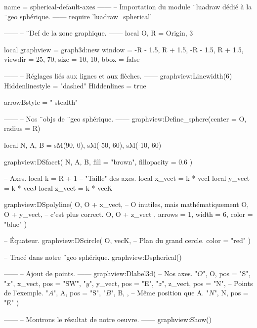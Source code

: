 \documentclass[border = 3pt]{standalone}
\begin{document}
\begin{luadraw*}{name = spherical-default-axes}
------
-- Importation du module ¨luadraw dédié à la ¨geo sphérique.
------
require 'luadraw_spherical'

------
-- ¨Def de la zone graphique.
------
local O, R = Origin, 3

local graphview = graph3d:new{
  window  = {-R - 1.5, R + 1.5, -R - 1.5, R + 1.5},
  viewdir = {25, 70},
  size    = {10, 10},
  bbox    = false
}

------
-- Réglages liés aux lignes et aux flèches.
------
graphview:Linewidth(6)
Hiddenlinestyle = "dashed"
Hiddenlines     = true

arrowBstyle = "-stealth"

------
-- Nos ¨objs de ¨geo sphérique.
------
graphview:Define_sphere({center = O, radius = R})

local N, A, B = sM(90, 0), sM(-50, 60), sM(-10, 60)

graphview:DSfacet(
  {N, A, B},
  {fill = "brown", fillopacity = 0.6}
)

-- Axes.
local k      = R + 1     -- "Taille" des axes.
local x_vect = k * vecI
local y_vect = k * vecJ
local z_vect = k * vecK

graphview:DSpolyline(
  {
    {O, O + x_vect},  -- O inutiles, mais mathématiquement
    {O, O + y_vect},  -- c'est plus correct.
    {O, O + z_vect}
  },
  {arrows = 1, width = 6, color = "blue"}
)

-- Équateur.
graphview:DScircle(
  {O, vecK},       -- Plan du grand cercle.
  {color = "red"}
)

-- Tracé dans notre ¨geo sphérique.
graphview:Dspherical()

------
-- Ajout de points.
------
graphview:Dlabel3d(
-- Nos axes.
  "$O$", O, {pos = "S"},
  "$x$", x_vect, {pos = "SW"},
  "$y$", y_vect, {pos = "E"},
  "$z$", z_vect, {pos = "N"},
-- Points de l'exemple.
  "$A$", A, {pos = "S"},
  "$B$", B, {},           -- Même position que A.
  "$N$", N, {pos = "E"}
)

------
-- Montrons le résultat de notre oeuvre.
------
graphview:Show()
\end{luadraw*}
\end{document}
